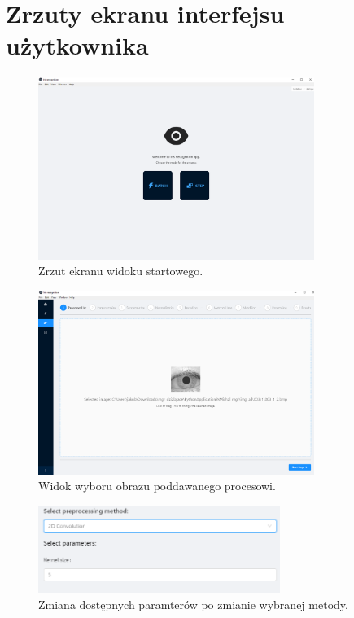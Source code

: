 \documentclass[10pt,polish,a4paper,oneside]{ppfcmthesis}
\begin{document}
\cleardoublepage\appendix 
\chapter{Zrzuty ekranu interfejsu użytkownika}
\label{appendix:appScreenShots}

\begin{figure}[ht]
  \centering
  \includegraphics[width=0.8\textwidth]{images/app/home.png}
  \caption{Zrzut ekranu widoku startowego.}
  \label{fig:homeScreen}
\end{figure}

\begin{figure}[ht]
  \centering
  \includegraphics[width=0.8\textwidth]{images/app/step1.png}
  \caption{Widok wyboru obrazu poddawanego procesowi.}
  \label{fig:processingImageSelectionScreen}
\end{figure}

\begin{figure}[ht]
  \centering
  \includegraphics[width=0.7\textwidth]{images/app/preprocessingOtherMethod.png}
  \caption{Zmiana dostępnych paramterów po zmianie wybranej metody.}
  \label{fig:preprocessingOtherMethod}
\end{figure}
\end{document}
